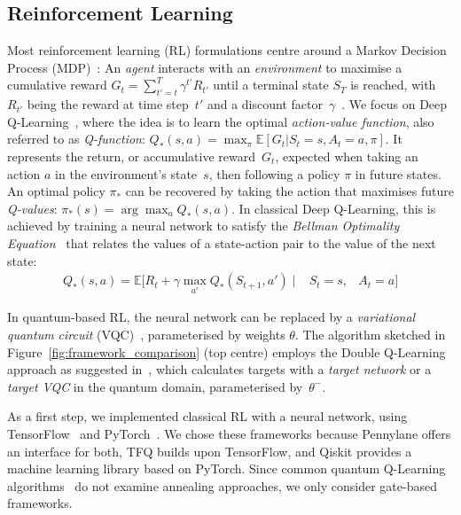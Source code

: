 \documentclass[conference]{IEEEtran}
\begin{document}
\subsection{Reinforcement Learning}
Most reinforcement learning (RL) formulations centre around a Markov Decision Process (MDP)~\cite{Bellman1957}:
An \emph{agent} interacts with an \textit{environment} to maximise a cumulative reward $G_t = \sum_{t'=t}^T \gamma^{t'} R_{t'}$
until a terminal state $S_T$ is reached, with $R_{t'}$ being the reward at time step~$t'$ and a discount
factor~$\gamma$~\cite{sutton2018}. We focus on Deep Q-Learning~\cite{WatkinsDayan92, mnih2013playing}, where
the idea is to learn the optimal \textit{action-value function}, also referred to as \textit{Q-function}:
$Q_*(s,a) = \max_\pi \mathbb{E} \left[G_t | S_t = s, A_t = a, \pi \right]$. It represents the
return, or accumulative reward~$G_t$, expected when taking an action $a$ in the environment's state~$s$,
then following a policy $\pi$ in future states. An optimal policy $\pi_*$ can be recovered by taking
the action that maximises future \textit{Q-values}: $\pi_*(s) = \arg \max_{a} Q_*(s,a)$. In classical
Deep Q-Learning, this is achieved by training a neural network to satisfy the 
\textit{Bellman Optimality Equation}~\cite{Bellman1957} that relates the values of a state-action pair to the value of the next state:
\begin{align}
    Q_*(s,a) = \mathbb{E}\Big[R_t + \gamma \max_{a'} Q_*(S_{t+1}, a') \mid &S_t = s, \nonumber &A_t = a\Big]
\end{align}

In quantum-based RL, the neural network can be replaced by a \emph{variational quantum circuit}
(VQC)~\cite{mitarai2018quantum, Chen.2020, Skolik.28.03.2021, OwenLockwood.2020}, parameterised by weights $\theta$.
The algorithm sketched in Figure~\ref{fig:framework_comparison} (top centre) employs the Double Q-Learning
approach as suggested in~\cite{van2016deep}, which calculates targets with a \textit{target network}
or a \textit{target VQC} in the quantum domain, parameterised by~$\theta^-$.

As a first step, we implemented classical RL with a neural network, using TensorFlow~\cite{tensorflow_developers_2021_5645375} and PyTorch~\cite{pytorch}. We chose these frameworks because Pennylane offers an interface for both, TFQ builds upon TensorFlow,
and Qiskit provides a machine learning library based on PyTorch. Since common quantum Q-Learning
algorithms~\cite{Chen.2020, Skolik.28.03.2021, OwenLockwood.2020} do not examine annealing approaches, we only consider
gate-based frameworks.
\end{document}
